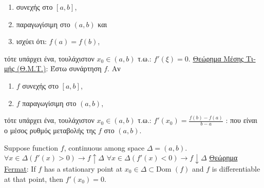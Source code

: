 \documentclass[12pt]{article}
\def\Dom{\text{Dom\ }} %
\begin{document}
\begin{flushleft}
	\begin{enumerate}
	\item \textgreek{συνεχής στο} $[a,b]$, 
	\item \textgreek{παραγωγίσιμη στο} $(a,b)$ \textgreek{και} 
	\item \textgreek{ισχύει ότι}: $f(a) = f(b)$,
	\end{enumerate}
	\textgreek{τότε υπάρχει ένα, τουλάχιστον} $x_0 \in (a,b)$ \textgreek{τ.ω.}: $f'(\xi)=0$. \linebreak 
	\textbullet \quad \uline{\textgreek{Θεώρημα Μέσης Τιμής (Θ.Μ.Τ.)}}: \textgreek{Έστω συνάρτηση} $f$. \textgreek{Αν}  
	\begin{enumerate}
	\item $f$ \textgreek{συνεχής στο} $[a,b]$, 
	\item $f$ \textgreek{παραγωγίσιμη στο} $(a,b)$, 
	\end{enumerate}
	\textgreek{τότε υπάρχει ένα, τουλάχιστον} $x_0 \in (a,b)$ \textgreek{τ.ω.}: $\displaystyle f'(x_0) = \frac{f(b)-f(a)}{b-a}$  :  \textgreek{που είναι ο μέσος ρυθμός μεταβολής της} $f$ \textgreek{στο} $(a,b)$. \linebreak 
	
	Suppose function $f$, continuous among space $\Delta = (a,b)$. \linebreak 
	\textbullet \quad $\displaystyle \forall x \in \Delta \left( f'(x) > 0 \right) \rightarrow f \uparrow \Delta$ \linebreak 
	\textbullet \quad $\displaystyle \forall x \in \Delta \left( f'(x) < 0 \right) \rightarrow f\downarrow \Delta$ \linebreak 
	\textbullet \quad \uline{\textgreek{Θεώρημα} Fermat}: If $f$ has a stationary point at $\displaystyle x_0 \in \Delta \subset \Dom(f)$ and $f$ is differentiable at that point, then $f'(x_0) = 0$. \linebreak 
	

\end{flushleft}
\end{document}

